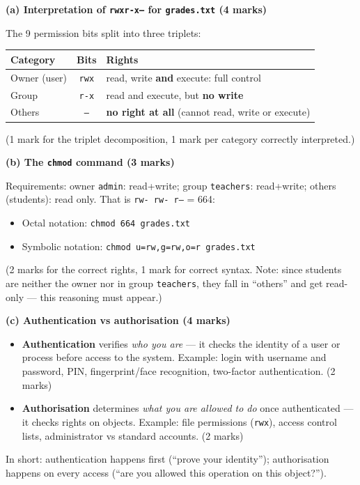 \documentclass[11pt]{article}
\begin{document}
\begin{corrige}
\textbf{(a) Interpretation of \texttt{rwxr-x---} for \texttt{grades.txt} (4 marks)}

The 9 permission bits split into three triplets:
\begin{center}
\begin{tabularx}{\linewidth}{|l|c|X|}
\hline
\rowcolor{popblueL}
\textbf{Category} & \textbf{Bits} & \textbf{Rights} \\
\hline
Owner (user) & \texttt{rwx} & read, write \textbf{and} execute: full control \\
\hline
Group & \texttt{r-x} & read and execute, but \textbf{no write} \\
\hline
Others & \texttt{---} & \textbf{no right at all} (cannot read, write or execute) \\
\hline
\end{tabularx}
\end{center}
(1 mark for the triplet decomposition, 1 mark per category correctly interpreted.)

\textbf{(b) The \texttt{chmod} command (3 marks)}

Requirements: owner \texttt{admin}: read+write; group \texttt{teachers}: read+write; others (students): read only. That is \texttt{rw- rw- r--} = 664:
\begin{itemize}
\item Octal notation: \texttt{chmod 664 grades.txt}
\item Symbolic notation: \texttt{chmod u=rw,g=rw,o=r grades.txt}
\end{itemize}
(2 marks for the correct rights, 1 mark for correct syntax. Note: since students are neither the owner nor in group \texttt{teachers}, they fall in ``others'' and get read-only — this reasoning must appear.)

\textbf{(c) Authentication vs authorisation (4 marks)}
\begin{itemize}
\item \textbf{Authentication} verifies \emph{who you are} — it checks the identity of a user or process before access to the system. Example: login with username and password, PIN, fingerprint/face recognition, two-factor authentication. (2 marks)
\item \textbf{Authorisation} determines \emph{what you are allowed to do} once authenticated — it checks rights on objects. Example: file permissions (\texttt{rwx}), access control lists, administrator vs standard accounts. (2 marks)
\end{itemize}
In short: authentication happens first (``prove your identity''); authorisation happens on every access (``are you allowed this operation on this object?'').


\end{corrige}
\end{document}
